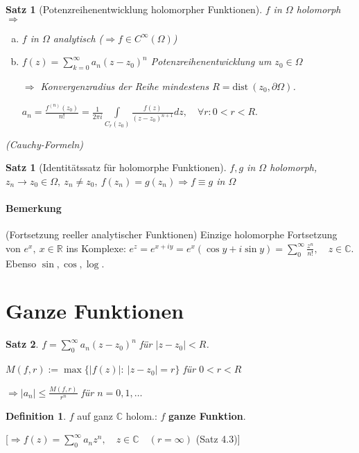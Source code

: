 \documentclass[ngerman,halfparskip]{scrartcl}
\newtheorem*{satz}{Satz}
\newtheorem*{satz*}{Satz}
\theoremstyle{definition}
\newtheorem*{defin}{Definition}
\def\R{\mathbb R}
\def\C{\mathbb C}
\begin{document}
\begin{satz}[Potenzreihenentwicklung holomorpher Funktionen]
$f$ in $\Omega$ holomorph $\Rightarrow$
\begin{enumerate}[a)]
\item $f$ in $\Omega$ analytisch ($\Rightarrow f\in C^\infty(\Omega)$)
\item $f(z)=\sum\limits_{k=0}^\infty a_n (z-z_0)^n$ Potenzreihenentwicklung um $z_0 \in \Omega$

$\Rightarrow$ Konvergenzradius der Reihe mindestens $R=\text{dist} ~ (z_0,\partial\Omega)$.

$a_n=\frac {f^{(n)}(z_0)}{n!}=\frac 1{2\pi i} \int\limits _{C_r(z_0)} \frac{f(z)}{(z-z_0)^{n+1}}dz, \quad \forall r: 0<r<R.$

\end{enumerate}
(Cauchy-Formeln)  
\end{satz}

\begin{satz*}[Identitätssatz für holomorphe Funktionen]
$f,g$ in $\Omega$ holomorph, $z_n\rightarrow z_0 \in\Omega,~ z_n\neq z_0, ~f(z_n)=g(z_n) \Rightarrow f\equiv g$ in $\Omega$
\end{satz*}

\paragraph{Bemerkung}(Fortsetzung reeller analytischer Funktionen) 
Einzige holomorphe Fortsetzung von $e^x, ~x\in\R$ ins Komplexe: $e^z=e^{x+iy}=e^x(\cos y +i \sin y)=\sum\limits _0^\infty\frac{z^n}{n!}, \quad z\in\C$. Ebenso $\sin, \cos, \log$.


\section{Ganze Funktionen}%
\begin{satz}
$f=\sum\limits_0^\infty a_n(z-z_0)^n$ für $|z-z_0|<R$.

$M(f,r):=\max\{|f(z)| :~ |z-z_0|=r\} $ für $0<r<R$

$\Rightarrow |a_n|\leq \frac{M(f,r)}{r^n}$ für $n=0,1,\ldots$


\end{satz}

\begin{defin}
$f$ auf ganz $\C $ holom.: $f$ \textbf{ganze Funktion}.

[$\Rightarrow f(z)=\sum\limits_0^\infty a_n z^n, \quad z\in\C \quad (r=\infty) $ (Satz 4.3)]
\end{defin}
\end{document}
